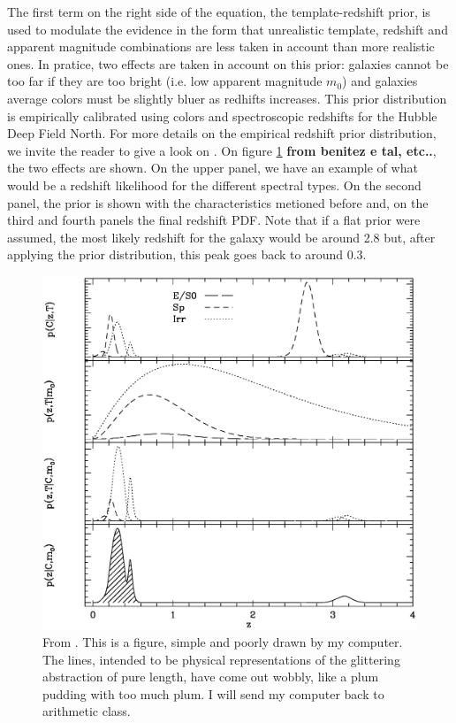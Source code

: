\documentclass[9pt]{memoir}
\begin{document}
The first term on the right side of the equation, the template-redshift prior, is used to modulate the evidence in the form that unrealistic template, redshift and apparent magnitude combinations are less taken in account than more realistic ones. In pratice, two effects are taken in account on this prior: galaxies cannot be too far if they are too bright (i.e. low apparent magnitude $m_0$) and galaxies average colors must be slightly bluer as redhifts increases. This prior distribution is empirically calibrated using colors and spectroscopic redshifts for the Hubble Deep Field North. For more details on the empirical redshift prior distribution, we invite the reader to give a look on \cite{Benitez.2000a}. On figure \ref{fig:prior} \textbf{from benitez e tal, etc..}, the two effects are shown. On the upper panel, we have an example of what would be a redshift likelihood for the different spectral types. On the second panel, the prior is shown with the characteristics metioned before and, on the third and fourth panels the final redshift PDF. Note that if a flat prior were assumed, the most likely redshift for the galaxy would be around 2.8 but, after applying the prior distribution, this peak goes back to around 0.3.

\begin{figure}
\begin{adjustwidth*}{1in}{0pt}
\centering
\includegraphics[width=1.3\textwidth]{figures/figpeaks.eps}
\end{adjustwidth*}
\caption{From \cite{Benitez.2000a}. This is a figure, simple and poorly drawn by my computer. The lines, intended to be physical representations of the glittering abstraction of pure length, have come out wobbly, like a plum pudding with too much plum. I will send my computer back to arithmetic class.}
\label{fig:prior}
\end{figure}
\end{document}
